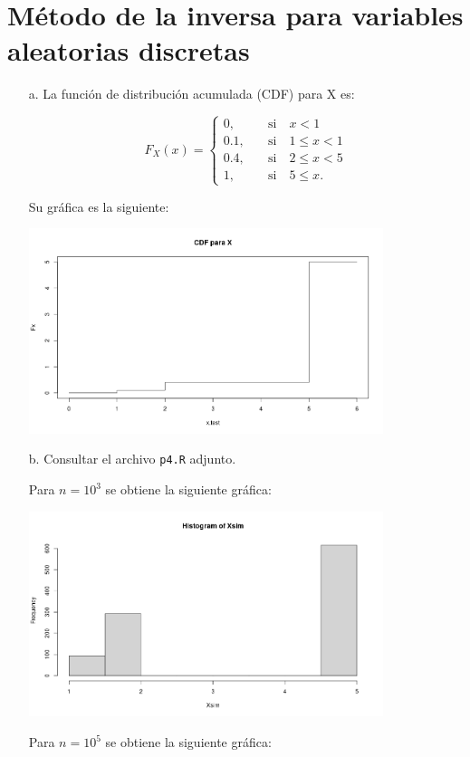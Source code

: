 \documentclass[11pt,letterpaper]{article}
\begin{document}
	\section{Método de la inversa para variables aleatorias discretas}
	\begin{itemize}
		\item[a.] La función de distribución acumulada (CDF) para X es:
		
		\[
		F_X(x) = 
		\begin{cases}
			0, &\quad\text{si}\quad x < 1 \\
			0.1, &\quad\text{si}\quad 1 \leq x < 1\\
			0.4, &\quad\text{si}\quad 2 \leq x < 5\\
			1, &\quad\text{si}\quad 5 \leq x.
		\end{cases}
		\]
		
		Su gráfica es la siguiente:
		
		\includegraphics[height=6cm]{p4.png}
		
		\item[b.] Consultar el archivo \texttt{p4.R} adjunto.
		
		Para $n=10^3$ se obtiene la siguiente gráfica:
		
		\includegraphics[height=6cm]{hist_10_3.png}
		
		Para $n=10^5$ se obtiene la siguiente gráfica:
		

\end{itemize}
\end{document}
